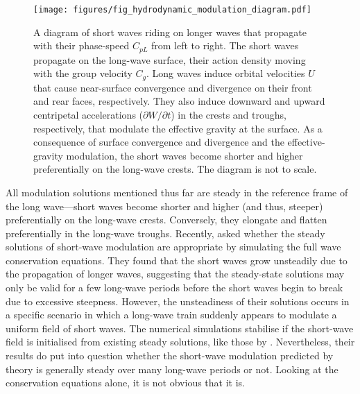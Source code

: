 \documentclass[lineno]{jfm}
\begin{document}
\begin{figure}
\centering
\texttt{[image: figures/fig\_hydrodynamic\_modulation\_diagram.pdf]}
\caption{
  A diagram of short waves riding on longer waves that propagate with their
  phase-speed $C_{pL}$ from left to right.
  The short waves propagate on the long-wave surface, their action density
  moving with the group velocity $C_g$.
  Long waves induce orbital velocities $U$ that cause near-surface convergence
  and divergence on their front and rear faces, respectively.
  They also induce downward and upward centripetal accelerations
  ($\partial W/\partial t$) in the crests and troughs, respectively, that
  modulate the effective gravity at the surface.
  As a consequence of surface convergence and divergence and the effective-gravity
  modulation, the short waves become shorter and higher preferentially
  on the long-wave crests.
  The diagram is not to scale.
}
\label{fig:hydrodynamic_modulation_diagram}
\end{figure}

All modulation solutions mentioned thus far are steady in the reference frame
of the long wave---short waves become shorter and higher (and thus, steeper)
preferentially on the long-wave crests.
Conversely, they elongate and flatten preferentially in the long-wave troughs.
Recently, \citet{peureux2021unsteady} asked whether the steady solutions
of short-wave modulation are appropriate by simulating the full wave conservation
equations.
They found that the short waves grow unsteadily due to the propagation of
longer waves, suggesting that the steady-state solutions may only be valid for
a few long-wave periods before the short waves begin to break due to excessive
steepness.
However, the unsteadiness of their solutions occurs in a specific scenario in
which a long-wave train suddenly appears to modulate a uniform field of short
waves.
The numerical simulations stabilise if the short-wave field is initialised
from existing steady solutions, like those by \citet{longuet1960changes}.
Nevertheless, their results do put into question whether the short-wave
modulation predicted by theory is generally steady over many long-wave periods
or not.
Looking at the conservation equations alone, it is not obvious that it is.
\end{document}
